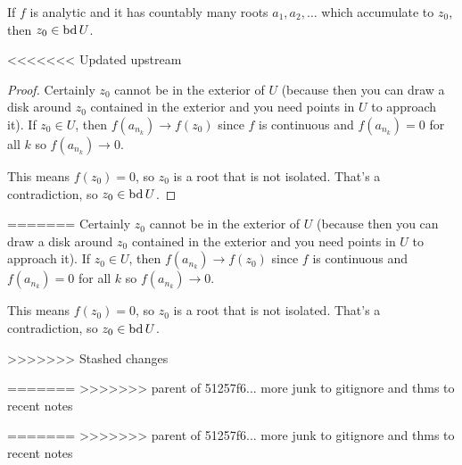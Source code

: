 \documentclass[notes]{subfile}
\begin{document}
\begin{theorem}
    If $f$ is analytic and it has countably many roots 
    $a_1, a_2, \ldots$ which accumulate to $z_0$, then 
    $z_0 \in \operatorname{bd} U$.
\end{theorem}

<<<<<<< Updated upstream
\begin{proof}
    Certainly $z_0$ cannot be in the exterior of $U$ (because then
    you can draw a disk around $z_0$ contained in the exterior
    and you need points in $U$ to approach it).
    If $z_0 \in U$, then $f(a_{n_k}) \to f(z_0)$ since $f$ is
    continuous and $f(a_{n_k}) = 0$ for all $k$ so $f(a_{n_k})
    \to 0$.

    This means $f(z_0) = 0$, 
    so $z_0$ is a root that is not isolated.
    That's a contradiction, so $z_0 \in \operatorname{bd} U$.
\end{proof}
=======
Certainly $z_0$ cannot be in the exterior of $U$ (because then
you can draw a disk around $z_0$ contained in the exterior
and you need points in $U$ to approach it).
If $z_0 \in U$, then $f(a_{n_k}) \to f(z_0)$ since $f$ is
continuous and $f(a_{n_k}) = 0$ for all $k$ so $f(a_{n_k})
\to 0$.

This means $f(z_0) = 0$, 
so $z_0$ is a root that is not isolated.
That's a contradiction, so $z_0 \in \operatorname{bd} U$.

>>>>>>> Stashed changes




=======
>>>>>>> parent of 51257f6... more junk to gitignore and thms to recent notes


=======
>>>>>>> parent of 51257f6... more junk to gitignore and thms to recent notes
\end{document}
